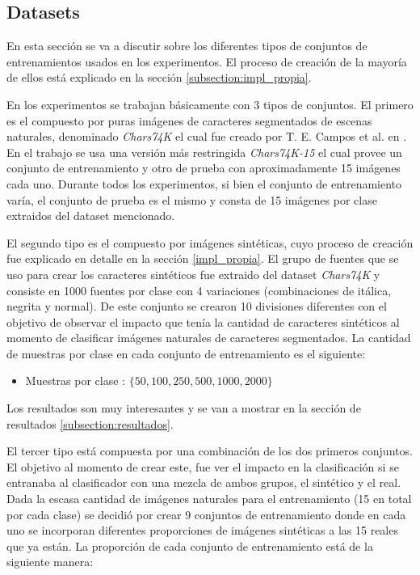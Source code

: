 \subsection{Datasets}

	En esta sección se va a discutir sobre los diferentes tipos de conjuntos de entrenamientos usados en los experimentos. El proceso de creación de la mayoría de ellos está explicado en la sección \ref{subsection:impl_propia}.
	
	En los experimentos se trabajan básicamente con 3 tipos de conjuntos. El primero es el compuesto por puras imágenes de caracteres segmentados de escenas naturales, denominado \textit{Chars74K} el cual fue creado por T. E. Campos et al. en \cite{dCBV09}. En el trabajo se usa una versión más restringida \textit{Chars74K-15} el cual provee un conjunto de entrenamiento y otro de prueba con aproximadamente 15 imágenes cada uno. Durante todos los experimentos, si bien el conjunto de entrenamiento varía, el conjunto de prueba es el mismo y consta de 15 imágenes por clase extraidos del dataset mencionado.
	
	El segundo tipo es el compuesto por imágenes sintéticas, cuyo proceso de creación fue explicado en detalle en la sección \ref{impl_propia}. El grupo de fuentes que se uso para crear los caracteres sintéticos fue extraido del dataset \textit{Chars74K} y consiste en 1000 fuentes por clase con 4 variaciones (combinaciones de itálica, negrita y normal). De este conjunto se crearon 10 divisiones diferentes con el objetivo de observar el impacto que tenía la cantidad de caracteres sintéticos al momento de clasificar imágenes naturales de caracteres segmentados. La cantidad de muestras por clase en cada conjunto de entrenamiento es el siguiente:
	\begin{itemize}
		\item Muestras por clase : $\{ 50,100,250,500,1000,2000\}$
	\end{itemize}

	 Los resultados son muy interesantes y se van a mostrar en la sección de resultados \ref{subsection:resultados}.
	
	El tercer tipo está compuesta por una combinación de los dos primeros conjuntos. El objetivo al momento de crear este, fue ver el impacto en la clasificación si se entranaba al clasificador con una mezcla de ambos grupos, el sintético y el real. Dada la escasa cantidad de imágenes naturales para el entrenamiento (15 en total por cada clase) se decidió por crear 9 conjuntos de entrenamiento donde en cada uno se incorporan diferentes proporciones de imágenes sintéticas a las 15 reales que ya están. La proporción de cada conjunto de entrenamiento está de la siguiente manera: 
	
